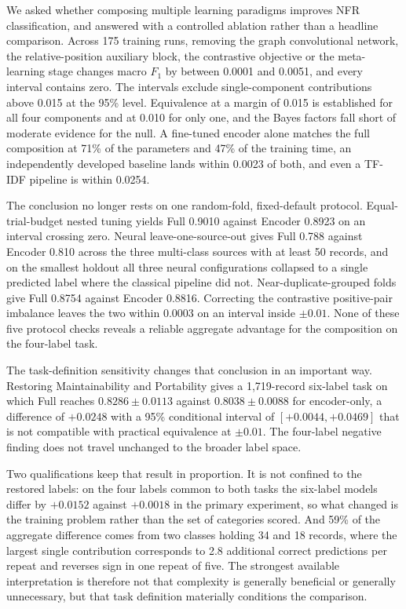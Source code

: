 \documentclass[11pt,a4paper]{article}
\begin{document}
We asked whether composing multiple learning paradigms improves NFR classification, and
answered with a controlled ablation rather than a headline comparison. Across 175 training
runs, removing the graph convolutional network, the relative-position auxiliary block, the contrastive
objective or the meta-learning stage changes macro $F_1$ by between 0.0001 and 0.0051, and
every interval contains zero. The intervals exclude single-component contributions above
0.015 at the 95\% level. Equivalence at a margin of 0.015 is established for all four
components and at 0.010 for only one, and the Bayes factors fall short of moderate evidence
for the null. A fine-tuned encoder alone matches the full composition at 71\% of the parameters and
47\% of the training time, an independently developed baseline lands within 0.0023 of both,
and even a TF-IDF pipeline is within 0.0254.

The conclusion no longer rests on one random-fold, fixed-default protocol. Equal-trial-budget nested tuning
yields Full 0.9010 against Encoder 0.8923 on an interval crossing zero. Neural leave-one-source-out gives
Full 0.788 against Encoder 0.810 across the three multi-class sources with at least 50 records, and on the
smallest holdout all three neural configurations collapsed to a single predicted label where the classical
pipeline did not. Near-duplicate-grouped folds give Full 0.8754 against Encoder 0.8816. Correcting the
contrastive positive-pair imbalance leaves the two within 0.0003 on an interval inside $\pm 0.01$. None of these five protocol checks reveals a reliable aggregate advantage for the composition on the
four-label task.

The task-definition sensitivity changes that conclusion in an important way. Restoring Maintainability and
Portability gives a 1,719-record six-label task on which Full reaches $0.8286 \pm 0.0113$ against
$0.8038 \pm 0.0088$ for encoder-only, a difference of $+0.0248$ with a 95\% conditional interval of
$[+0.0044, +0.0469]$ that is not compatible with practical equivalence at $\pm 0.01$. The four-label
negative finding does not travel unchanged to the broader label space.

Two qualifications keep that result in proportion. It is not confined to the restored labels: on the four
labels common to both tasks the six-label models differ by $+0.0152$ against $+0.0018$ in the primary
experiment, so what changed is the training problem rather than the set of categories scored. And 59\% of
the aggregate difference comes from two classes holding 34 and 18 records, where the largest single
contribution corresponds to 2.8 additional correct predictions per repeat and reverses sign in one repeat
of five. The strongest available interpretation is therefore not that complexity is generally beneficial or
generally unnecessary, but that task definition materially conditions the comparison.
\end{document}
